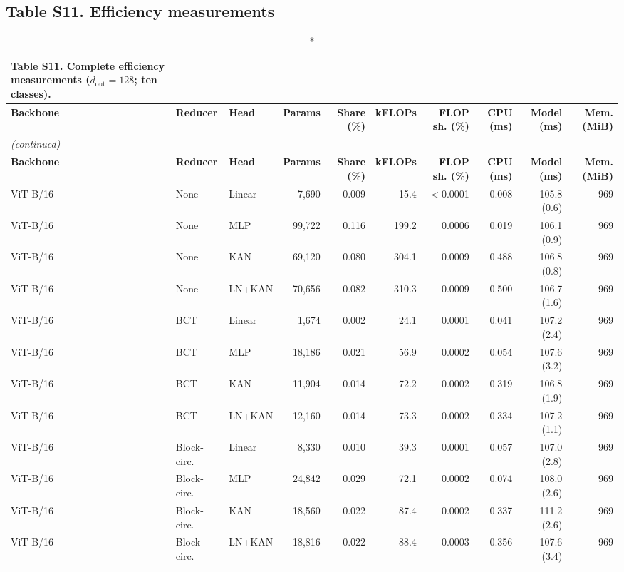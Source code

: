 \documentclass[10pt]{article}
\begin{document}
\subsection*{Table S11. Efficiency measurements}
\scriptsize
\setlength{\tabcolsep}{3pt}
\begin{longtable}{lllrrrrrrr}
\caption*{\textbf{Table S11.} Complete efficiency measurements ($d_{\mathrm{out}}=128$; ten classes).}\\
\toprule
\textbf{Backbone} & \textbf{Reducer} & \textbf{Head} & \textbf{Params} & \textbf{Share (\%)} & \textbf{kFLOPs} & \textbf{FLOP sh. (\%)} & \textbf{CPU (ms)} & \textbf{Model (ms)} & \textbf{Mem. (MiB)} \\
\midrule
\endfirsthead
\multicolumn{10}{l}{\textit{(continued)}}\\
\toprule
\textbf{Backbone} & \textbf{Reducer} & \textbf{Head} & \textbf{Params} & \textbf{Share (\%)} & \textbf{kFLOPs} & \textbf{FLOP sh. (\%)} & \textbf{CPU (ms)} & \textbf{Model (ms)} & \textbf{Mem. (MiB)} \\
\midrule
\endhead
\bottomrule
\endfoot
ViT-B/16 & None & Linear & 7,690 & 0.009 & 15.4 & $<$0.0001 & 0.008 & 105.8 (0.6) & 969 \\
ViT-B/16 & None & MLP & 99,722 & 0.116 & 199.2 & 0.0006 & 0.019 & 106.1 (0.9) & 969 \\
ViT-B/16 & None & KAN & 69,120 & 0.080 & 304.1 & 0.0009 & 0.488 & 106.8 (0.8) & 969 \\
ViT-B/16 & None & LN+KAN & 70,656 & 0.082 & 310.3 & 0.0009 & 0.500 & 106.7 (1.6) & 969 \\
ViT-B/16 & BCT & Linear & 1,674 & 0.002 & 24.1 & 0.0001 & 0.041 & 107.2 (2.4) & 969 \\
ViT-B/16 & BCT & MLP & 18,186 & 0.021 & 56.9 & 0.0002 & 0.054 & 107.6 (3.2) & 969 \\
ViT-B/16 & BCT & KAN & 11,904 & 0.014 & 72.2 & 0.0002 & 0.319 & 106.8 (1.9) & 969 \\
ViT-B/16 & BCT & LN+KAN & 12,160 & 0.014 & 73.3 & 0.0002 & 0.334 & 107.2 (1.1) & 969 \\
ViT-B/16 & Block-circ. & Linear & 8,330 & 0.010 & 39.3 & 0.0001 & 0.057 & 107.0 (2.8) & 969 \\
ViT-B/16 & Block-circ. & MLP & 24,842 & 0.029 & 72.1 & 0.0002 & 0.074 & 108.0 (2.6) & 969 \\
ViT-B/16 & Block-circ. & KAN & 18,560 & 0.022 & 87.4 & 0.0002 & 0.337 & 111.2 (2.6) & 969 \\
ViT-B/16 & Block-circ. & LN+KAN & 18,816 & 0.022 & 88.4 & 0.0003 & 0.356 & 107.6 (3.4) & 969 \\

\end{longtable}
\end{document}
